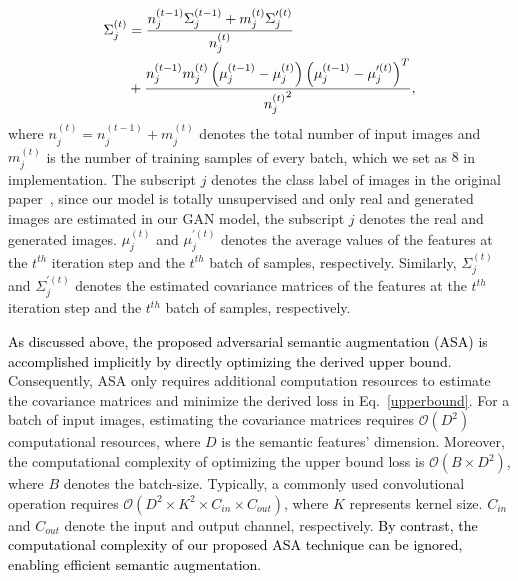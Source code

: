 \documentclass[10pt,journal,compsoc]{IEEEtran}
\newcommand{\revise}[1]{\textcolor{black}{#1}}
\begin{document}
\revise{\begin{align}
\footnotesize
\label{sigma}
\Sigma_{j}^{(t)}&=
\frac{n_{j}^{(t-1)} \Sigma_{j}^{(t-1)}+m_{j}^{(t)} \Sigma_{j}^{\prime(t)}}{n_{j}^{(t)}} \notag\\
&+ \frac{n_{j}^{(t-1)} m_{j}^{(t)}\left({\mu}_{j}^{(t-1)}-{\mu}_{j}^{(t)}\right)\left({\mu}_{j}^{(t-1)}-{{\mu}}_{j}^{\prime(t)}\right)^{T}}{{n_{j}^{(t)}}^{2}},
\end{align}
}
where $n_{j}^{(t)}=n_{j}^{(t-1)}+m_{j}^{(t)}$ denotes the total number of input images and $m_{j}^{(t)}$ is the number of training samples of every batch, which we set as $8$ in implementation. The subscript $j$ denotes the class label of images in the original paper~\cite{ISDATPAMI2021}, since our model is totally unsupervised and only real and generated images are estimated in our GAN model, the subscript $j$ denotes the real and generated images.
$\mu_{j}^{(t)}$ and ${\mu}_{j}^{\prime(t)}$ denotes the average values of the features at the $t^{th}$ iteration step and the $t^{th}$ batch of samples, respectively.
Similarly, $\Sigma_{j}^{(t)}$ and ${\Sigma}_{j}^{\prime(t)}$ denotes the estimated covariance matrices of the features at the $t^{th}$ iteration step and the $t^{th}$ batch of samples, respectively.

%
\revise{As discussed above, the proposed adversarial semantic augmentation (ASA) is accomplished implicitly by directly optimizing the derived upper bound}.
%
Consequently, ASA only requires additional computation resources to estimate the covariance matrices and minimize the derived loss in Eq.~\ref{upperbound}.
%
For a batch of input images, estimating the covariance matrices requires $\mathcal{O}(D^2)$ computational resources, where $D$ is the semantic features' dimension.
%
Moreover, the computational complexity of optimizing the upper bound loss is $\mathcal{O}(B \times D^2)$, where $B$ denotes the batch-size.
Typically, a commonly used convolutional operation requires $\mathcal{O}(D^2 \times K^2 \times C_{in} \times C_{out})$, where $K$ represents kernel size.
$C_{in}$ and $C_{out}$ denote the input and output channel, respectively.
%
\revise{By contrast, the computational complexity of our proposed ASA technique can be ignored, enabling efficient semantic augmentation}.
\end{document}
